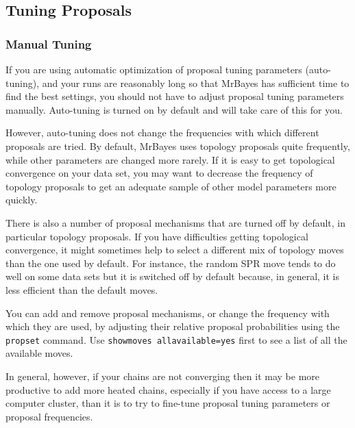 \documentclass[12pt]{book}
\begin{document}
\subsection{Tuning Proposals}

\subsubsection{Manual Tuning}

If you are using automatic optimization of proposal tuning parameters (auto-tuning), and your runs
are reasonably long so that MrBayes has sufficient time to find the best settings, you should not
have to adjust proposal tuning parameters manually. Auto-tuning is turned on by default and will
take care of this for you.

However, auto-tuning does not change the frequencies with which different proposals are tried. By
default, MrBayes uses topology proposals quite frequently, while other parameters are changed more
rarely. If it is easy to get topological convergence on your data set, you may want to decrease the
frequency of topology proposals to get an adequate sample of other model parameters more quickly.

There is also a number of proposal mechanisms that are turned off by default, in particular
topology proposals. If you have difficulties getting topological convergence, it might sometimes
help to select a different mix of topology moves than the one used by default. For instance, the
random SPR move tends to do well on some data sets but it is switched off by default because, in
general, it is less efficient than the default moves.

You can add and remove proposal mechanisms, or change the frequency with which they are used, by
adjusting their relative proposal probabilities using the \texttt{propset} command. Use
\texttt{showmoves allavailable=yes} first to see a list of all the available moves.

In general, however, if your chains are not converging then it may be more productive to add more
heated chains, especially if you have access to a large computer cluster, than it is to try to
fine-tune proposal tuning parameters or proposal frequencies.

\end{document}
